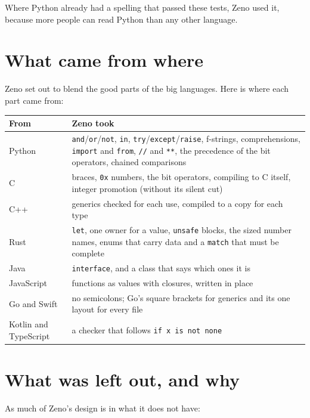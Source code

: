 Where Python already had a spelling that passed these tests, Zeno used
it, because more people can read Python than any other language.

\section{What came from where}

Zeno set out to blend the good parts of the big languages. Here is
where each part came from:

\begin{center}
\begin{tabular}{lP{9.4cm}}
\toprule
From & Zeno took \\
\midrule
Python & \verb|and|/\verb|or|/\verb|not|, \verb|in|, \verb|try|/\verb|except|/\verb|raise|,
  f-strings, comprehensions, \verb|import| and \verb|from|, \verb|//| and \verb|**|,
  the precedence of the bit operators, chained comparisons \\
C & braces, \verb|0x| numbers, the bit operators, compiling to C itself,
  integer promotion (without its silent cut) \\
C++ & generics checked for each use, compiled to a copy for each type \\
Rust & \verb|let|, one owner for a value, \verb|unsafe| blocks, the sized
  number names, enums that carry data and a \verb|match| that must be complete \\
Java & \verb|interface|, and a class that says which ones it is \\
JavaScript & functions as values with closures, written in place \\
Go and Swift & no semicolons; Go's square brackets for generics and its one
  layout for every file \\
Kotlin and TypeScript & a checker that follows \verb|if x is not none| \\
\bottomrule
\end{tabular}
\end{center}

\section{What was left out, and why}

As much of Zeno's design is in what it does not have:

